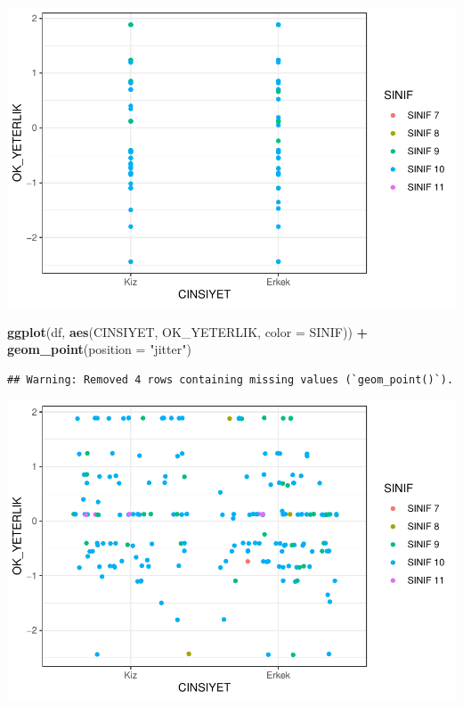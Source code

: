 \documentclass[
  oneside]{book}
\newenvironment{Shaded}{\begin{snugshade}}{\end{snugshade}}
\newcommand{\AttributeTok}[1]{\textcolor[rgb]{0.13,0.29,0.53}{#1}}
\newcommand{\FunctionTok}[1]{\textcolor[rgb]{0.13,0.29,0.53}{\textbf{#1}}}
\newcommand{\NormalTok}[1]{#1}
\newcommand{\SpecialCharTok}[1]{\textcolor[rgb]{0.81,0.36,0.00}{\textbf{#1}}}
\newcommand{\StringTok}[1]{\textcolor[rgb]{0.31,0.60,0.02}{#1}}
\begin{document}
\begin{center}\includegraphics[width=1\linewidth]{15-betimleyici-istatistik_files/figure-latex/unnamed-chunk-43-1} \end{center}

\begin{Shaded}
\begin{Highlighting}[]
\FunctionTok{ggplot}\NormalTok{(df, }\FunctionTok{aes}\NormalTok{(CINSIYET, OK\_YETERLIK, }\AttributeTok{color =}\NormalTok{ SINIF)) }\SpecialCharTok{+}
  \FunctionTok{geom\_point}\NormalTok{(}\AttributeTok{position =} \StringTok{"jitter"}\NormalTok{)}
\end{Highlighting}
\end{Shaded}

\begin{verbatim}
## Warning: Removed 4 rows containing missing values (`geom_point()`).
\end{verbatim}

\begin{center}\includegraphics[width=1\linewidth]{15-betimleyici-istatistik_files/figure-latex/unnamed-chunk-44-1} \end{center}
\end{document}
